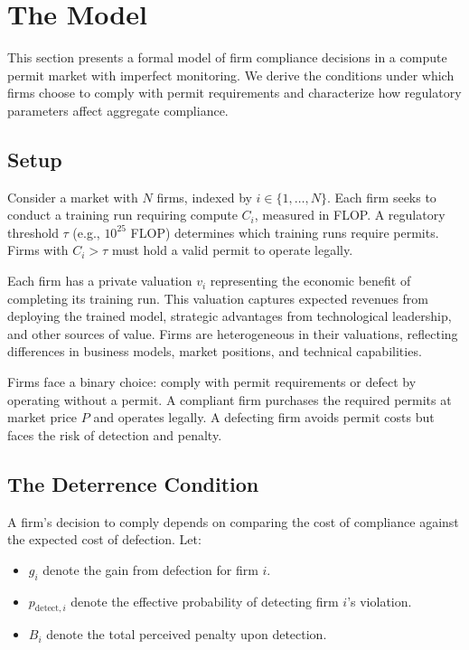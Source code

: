 
\section{The Model}

This section presents a formal model of firm compliance decisions in a compute permit market with imperfect monitoring. We derive the conditions under which firms choose to comply with permit requirements and characterize how regulatory parameters affect aggregate compliance.

\subsection{Setup}

Consider a market with $N$ firms, indexed by $i \in \{1, \ldots, N\}$. Each firm seeks to conduct a training run requiring compute $C_i$, measured in FLOP. A regulatory threshold $\tau$ (e.g., $10^{25}$ FLOP) determines which training runs require permits. Firms with $C_i > \tau$ must hold a valid permit to operate legally.

Each firm has a private valuation $v_i$ representing the economic benefit of completing its training run. This valuation captures expected revenues from deploying the trained model, strategic advantages from technological leadership, and other sources of value. Firms are heterogeneous in their valuations, reflecting differences in business models, market positions, and technical capabilities.

Firms face a binary choice: comply with permit requirements or defect by operating without a permit. A compliant firm purchases the required permits at market price $P$ and operates legally. A defecting firm avoids permit costs but faces the risk of detection and penalty.

\subsection{The Deterrence Condition}

A firm's decision to comply depends on comparing the cost of compliance against the expected cost of defection. Let:

\begin{itemize}
    \item $g_i$ denote the gain from defection for firm $i$.
    \item $p_{\mathrm{detect},i}$ denote the effective probability of detecting firm $i$'s violation.
    \item $B_i$ denote the total perceived penalty upon detection.
\end{itemize}

